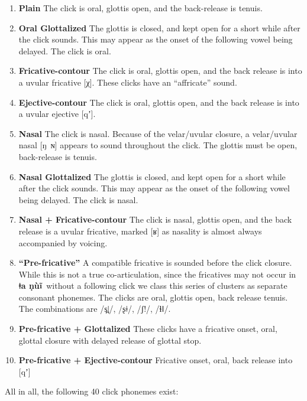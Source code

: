 \documentclass[11pt]{book}
\newcommand{\qcn}[1]{\textbf{#1}}
\newcommand{\langname}{\qcn{ǂa ṇùĩ}~}
\begin{document}
\begin{enumerate}[I]
\item \textbf{Plain} The click is oral, glottis open, and the back-release is tenuis.
\item \textbf{Oral Glottalized} The glottis is closed, and kept open for a short while after the click sounds. This may appear as the onset of the following vowel being delayed. The click is oral.
\item \textbf{Fricative-contour} The click is oral, glottis open, and the back release is into a uvular fricative [χ]. These clicks have an ``affricate'' sound.
\item \textbf{Ejective-contour} The click is oral, glottis open, and the back release is into a uvular ejective [qʼ].
\item \textbf{Nasal} The click is nasal. Because of the velar/uvular closure, a velar/uvular nasal [ŋ~ɴ] appears to sound throughout the click. The glottis must be open, back-release is tenuis.
\item \textbf{Nasal Glottalized} The glottis is closed, and kept open for a short while after the click sounds. This may appear as the onset of the following vowel being delayed. The click is nasal.
\item \textbf{Nasal + Fricative-contour} The click is nasal, glottis open, and the back release is a uvular fricative, marked [ʁ] as nasality is almost always accompanied by voicing.
\item \textbf{``Pre-fricative''} A compatible fricative is sounded before the click closure. While this is not a true co-articulation, since the fricatives may not occur in \langname without a following click we class this series of clusters as separate consonant phonemes. The clicks are oral, glottis open, back release tenuis. The combinations are /s̪ǀ/, /ʂǂ/, /ʃ!/, /ɬǁ/.
\item \textbf{Pre-fricative + Glottalized} These clicks have a fricative onset, oral, glottal closure with delayed release of glottal stop.
\item \textbf{Pre-fricative + Ejective-contour} Fricative onset, oral, back release into [qʼ]
\end{enumerate}

All in all, the following 40 click phonemes exist:
\end{document}
